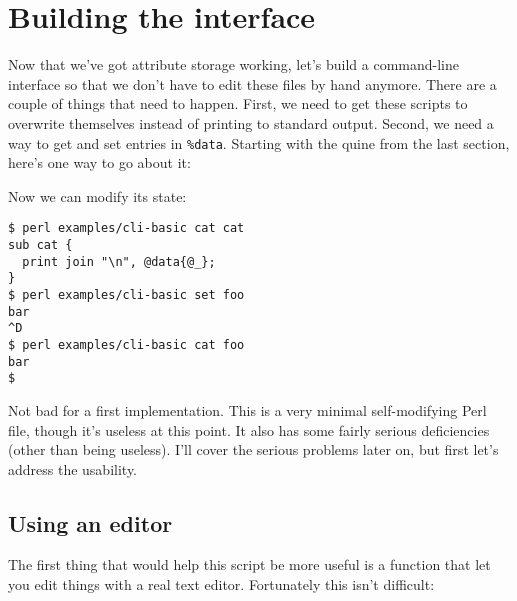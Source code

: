 \documentclass{report}
\begin{document}
\chapter{Building the interface}\label{sec:building-the-interface}
  Now that we've got attribute storage working, let's build a command-line interface so that we don't have to edit these files by hand anymore. There are a couple of things that need to
  happen. First, we need to get these scripts to overwrite themselves instead of printing to standard output. Second, we need a way to get and set entries in \verb|%data|. Starting with the
  quine from the last section, here's one way to go about it:


  \noindent Now we can modify its state:

\begin{verbatim}
$ perl examples/cli-basic cat cat
sub cat {
  print join "\n", @data{@_};
}
$ perl examples/cli-basic set foo
bar
^D
$ perl examples/cli-basic cat foo
bar
$
\end{verbatim}

  Not bad for a first implementation. This is a very minimal self-modifying Perl file, though it's useless at this point. It also has some fairly serious deficiencies (other than being
  useless). I'll cover the serious problems later on, but first let's address the usability.

\section{Using an editor}\label{sec:using-an-editor}
    The first thing that would help this script be more useful is a function that let you edit things with a real text editor. Fortunately this isn't difficult:
\end{document}
